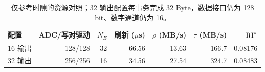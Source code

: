 \begin{table}[htbp]\centering\small
\begin{tabular}{@{}lrrrrrr@{}}\toprule
配置 & ADC/写对驱动 & $N_E$ & 刷新 ($\mu$s) & $\rho$ (MB/s) & $\tau$ (MB/s) & $\mathrm{RI}^*$\\\midrule
16 输出 & 128/128 & 32 & 66.56 & 13.63 & 166.7 & 0.08176\\
32 输出 & 256/256 & 16 & 34.56 & 27.54 & 324.7 & 0.08483\\
\bottomrule\end{tabular}
\caption{仅参考时隙的资源对照；32 输出配置每事务完成 32 Byte，数据接口仍为 128 bit、数字通道仍为 16。}\label{09_gain_cell_edram:tab:wide}\end{table}
